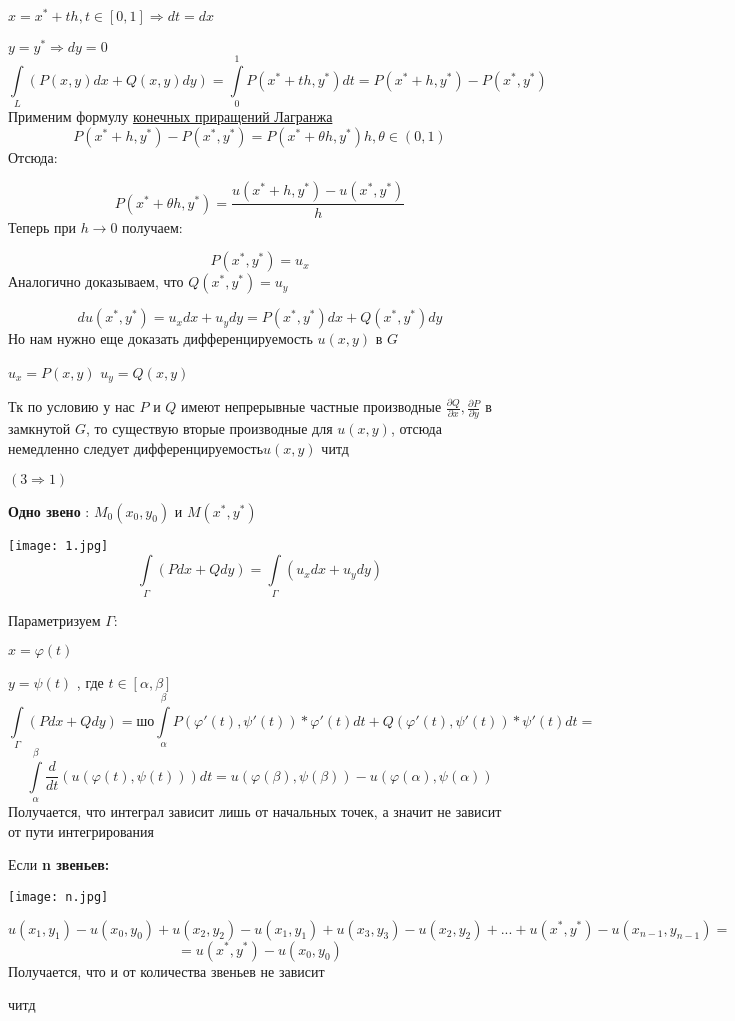 \documentclass[12pt]{article}
\begin{document}
	$x = x^* + th , t \in [0,1] \Rightarrow dt = dx$
	
	$y = y^* \Rightarrow dy = 0$
$$
\int\limits_{L} (P(x,y)dx + Q(x,y)dy) = \int\limits_{0}^{1}P(x^* + th,y^*)dt
=
P(x^* + h,y^*) - P(x^*,y^*)
$$	
Применим формулу \hyperref[eq5]{конечных приращений Лагранжа}
$$
P(x^* + h,y^*) - P(x^*,y^*) = P(x^* + \theta h,y^*)h  ,\theta \in (0,1)
$$
Отсюда:
	
$$
P(x^* + \theta h,y^*) 
=
\frac{u(x^* + h , y^*) - u(x^* , y^*)}{h}
$$
Теперь при $h \to 0$	 получаем:

$$
P(x^* , y^*) 
=
u_x
$$
Аналогично доказываем, что $Q(x^* , y^*) = u_y$

$$
du(x^* , y^*) = u_x dx + u_y dy = P(x^* , y^*) dx + Q(x^* , y^*) dy
$$
Но нам нужно еще доказать дифференцируемость $u(x,y)$ в $G$

$u_x = P(x , y)$
$u_y = Q(x , y)$

Тк по условию у нас $P$ и $Q$ имеют непрерывные частные производные $\frac{\partial Q}{\partial x},\frac{\partial P}{\partial y} $ в замкнутой $G$, то существую вторые производные для $u(x,y)$, отсюда немедленно следует дифференцируемость$u(x,y)$
читд	
	
$(3 \Rightarrow 1)$	

\textbf{Одно звено} : $M_0(x_0 , y_0)$ и $M(x^* , y^*)$ 

\texttt{[image: 1.jpg]}
$$
\int\limits_{\Gamma} (Pdx + Qdy) 
=
\int\limits_{\Gamma} (u_xdx + u_ydy) 
$$

Параметризуем $\Gamma$:

 $ x = \varphi(t)$
 
 $ y = \psi(t)$ , где $t \in [\alpha , \beta]$
$$
\int\limits_{\Gamma} (Pdx + Qdy)
=шо
\int\limits_{\alpha}^{\beta} P(\varphi'(t) , \psi'(t))*\varphi'(t)dt 
+ Q(\varphi'(t) , \psi'(t))*\psi'(t)dt 
=
$$
$$
\int\limits_{\alpha}^{\beta} \frac{d}{dt}(u(\varphi(t) ,\psi(t)))dt 
= 
u(\varphi(\beta) ,\psi(\beta)) -  u(\varphi(\alpha) ,\psi(\alpha))
$$
Получается, что интеграл зависит лишь от начальных точек, а значит не зависит от пути интегрирования

Если \textbf{n звеньев:}

\texttt{[image: n.jpg]}	

$$
u(x_1 , y_1) - u(x_0 , y_0) 
+ 
u(x_2 , y_2) - u(x_1 , y_1)
+ 
u(x_3 , y_3) - u(x_2 , y_2)
+ ... +
u(x^* , y^*) - u(x_{n-1} , y_{n-1})
=
$$
$$
=
u(x^* , y^*) - u(x_0 , y_0)
$$
Получается, что и от количества звеньев не зависит

читд
\end{document}

